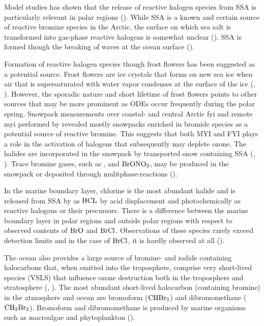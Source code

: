 \medskip

Model studies has shown that the release of reactive halogen species from SSA is particularly relevant in polar regions (\cite{Schmidt}). While SSA is a known and certain source of reactive bromine species in the Arctic, the surface on which sea salt is transformed into gas-phase reactive halogens is somewhat unclear (\cite{Simpson2005}). SSA is formed though the breaking of waves at the ocean surface (\cite{Simpson2015}). 

\medskip

Formation of reactive halogen species though frost flowers has been suggested as a potential source. Frost flowers are ice crystals that forms on new sea ice when air that is supersaturated with water vapor condenses at the surface of the ice (\cite{GRANFORS2013124}, \cite{Kaleschke}). However, the sporadic nature and short lifetime of frost flowers points to other sources that may be more prominent as ODEs occur frequently during the polar spring. Snowpack measurements over coastal- and central Arctic \acrfull{fyi} and remote \acrfull{myi} performed by \cite{Peterson2019} revealed mostly snowpacks enriched in bromide species as a potential source of reactive bromine. This suggests that both MYI and FYI plays a role in the activation of halogens that subsequently may deplete ozone. The halides are incorporated in the snowpack by transported snow containing SSA (\cite{Toyota}, \cite{Peterson2019}). Trace bromine gases, such as ,  and $\mathrm{BrONO_2}$, may be produced in the snowpack or deposited through mulitphase-reactions (\cite{Simpson2005}). 


\medskip


In the marine boundary layer, chlorine is the most abundant halide and is released from SSA by as $\mathrm{HCL}$ by acid displacement and photochemically as reactive halogens or their precursors. There is a difference between the marine boundary layer in polar regions and outside polar regions with respect to observed contents of $\mathrm{BrO}$ and $\mathrm{BrCl}$. Observations of these species rarely exceed detection limits and in the case of $\mathrm{BrCl}$, it is hardly observed at all (\cite{Simpson2015}). 

\medskip

The ocean also provides a large source of bromine- and iodide containing halocarbons that, when emitted into the troposphere, comprise very short-lived species (VSLS) that influence ozone destruction both in the troposphere and stratosphere (\cite{ziska}, \cite{Simpson2015}). The most abundant short-lived halocarbon (containing bromine) in the atmosphere and ocean are bromoform ($\mathrm{CHBr_3}$) and dibromomethane ($\mathrm{CH_2Br_2}$). Bromoform and dibromomethane is produced by marine organisms such as macroalgae and phytoplankton (\cite{Quack2003}).


